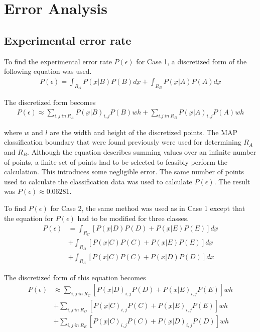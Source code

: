 \section{Error Analysis}
\subsection{Experimental error rate}
To find the experimental error rate $P(\epsilon)$ for Case 1, a discretized form of the following equation was used.
\begin{eqnarray}
\label{eqn:2-class_cont_PofE}
P(\epsilon)=\int_{R_A}P(\underbar {x}|B)P(B)d\underbar {x} +
            \int_{R_B}P(\underbar {x}|A)P(A)d\underbar {x}
\end{eqnarray}

The discretized form becomes
\begin{eqnarray}
\label{eqn:2-class_disc_PofE}
P(\epsilon)\approx\sum_{i,j\ in\ R_A}P(\underbar {x}|B)_{i,j}P(B)wh +
                  \sum_{i.j\ in\ R_B}P(\underbar {x}|A)_{i,j}P(A)wh
\end{eqnarray}

where $w$ and $l$ are the width and height of the discretized points. The MAP classification boundary that were found previously were used for determining $R_A$ and $R_B$. Although the equation describes summing values over an infinite number of points, a finite set of points had to be selected to feasibly perform the calculation. This introduces some negligible error. The same number of points used to calculate the classification data was used to calculate $P(\epsilon)$. The result was $P(\epsilon)\approx0.06281$.

To find $P(\epsilon)$ for Case 2, the same method was used as in Case 1 except that the equation for $P(\epsilon)$ had to be modified for three classes.
\begin{eqnarray}
\label{eqn:3-class_cont_PofE}
P(\epsilon)& = \int_{R_C}[P(\underbar{x}|D)P(D)+P(\underbar{x}|E)P(E)]d\underbar{x} \\
           & + \int_{R_D}[P(\underbar{x}|C)P(C)+P(\underbar{x}|E)P(E)]d\underbar{x} \nonumber\\
           & + \int_{R_E}[P(\underbar{x}|C)P(C)+P(\underbar{x}|D)P(D)]d\underbar{x}\nonumber
\end{eqnarray}

The discretized form of this equation becomes
\begin{eqnarray}
\label{eqn:3-class_disc_PofE}
P(\epsilon)&\approx \sum_{i,j\ in\ R_C}[P(\underbar{x}|D)_{i,j}P(D)+P(\underbar{x}|E)_{i,j}P(E)]wh \\
           & +      \sum_{i,j\ in\ R_D}[P(\underbar{x}|C)_{i,j}P(C)+P(\underbar{x}|E)_{i,j}P(E)]wh \nonumber\\
           & +      \sum_{i,j\ in\ R_E}[P(\underbar{x}|C)_{i,j}P(C)+P(\underbar{x}|D)_{i,j}P(D)]wh \nonumber
\end{eqnarray}

